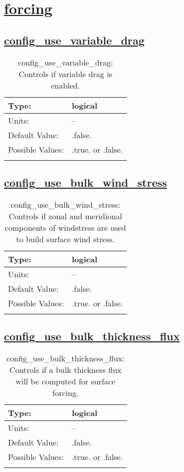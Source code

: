 \section[forcing]{\hyperref[sec:nm_tab_forcing]{forcing}}
\label{sec:nm_sec_forcing}
\subsection[config\_use\_variable\_drag]{\hyperref[sec:nm_tab_forcing]{config\_use\_variable\_drag}}
\label{subsec:nm_sec_config_use_variable_drag}
\begin{center}
\begin{longtable}{| p{2.0in} || p{4.0in} |}
    \hline
    Type: & logical \\
    \hline
    Units: & -- \\
    \hline
    Default Value: & .false. \\
    \hline
    Possible Values: & .true. or .false. \\
    \hline
    \caption{config\_use\_variable\_drag: Controls if variable drag is enabled.}
\end{longtable}
\end{center}
\subsection[config\_use\_bulk\_wind\_stress]{\hyperref[sec:nm_tab_forcing]{config\_use\_bulk\_wind\_stress}}
\label{subsec:nm_sec_config_use_bulk_wind_stress}
\begin{center}
\begin{longtable}{| p{2.0in} || p{4.0in} |}
    \hline
    Type: & logical \\
    \hline
    Units: & -- \\
    \hline
    Default Value: & .false. \\
    \hline
    Possible Values: & .true. or .false. \\
    \hline
    \caption{config\_use\_bulk\_wind\_stress: Controls if zonal and meridional components of windstress are used to build surface wind stress.}
\end{longtable}
\end{center}
\subsection[config\_use\_bulk\_thickness\_flux]{\hyperref[sec:nm_tab_forcing]{config\_use\_bulk\_thickness\_flux}}
\label{subsec:nm_sec_config_use_bulk_thickness_flux}
\begin{center}
\begin{longtable}{| p{2.0in} || p{4.0in} |}
    \hline
    Type: & logical \\
    \hline
    Units: & -- \\
    \hline
    Default Value: & .false. \\
    \hline
    Possible Values: & .true. or .false. \\
    \hline
    \caption{config\_use\_bulk\_thickness\_flux: Controls if a bulk thickness flux will be computed for surface forcing.}
\end{longtable}
\end{center}
